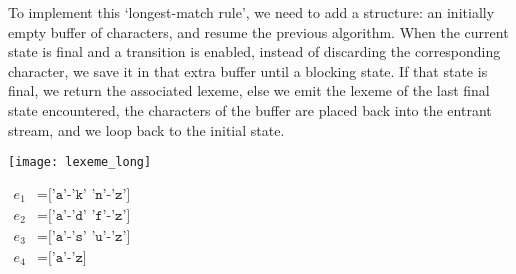 \documentclass[12pt,a4paper]{article}
\begin{document}
To implement this `longest\hyp{}match rule', we need to add a
structure: an initially empty buffer of characters, and resume the
previous algorithm. When the current state is final and a transition
is enabled, instead of discarding the corresponding character, we save
it in that extra buffer until a blocking state. If that state is
final, we return the associated lexeme, else we emit the lexeme of the
last final state encountered, the characters of the buffer are placed
back into the entrant stream, and we loop back to the initial state.
\begin{center}
\begin{minipage}{0.45\linewidth}
\texttt{[image: lexeme\_long]}
\end{minipage}
\hspace*{15mm}
\begin{minipage}{0.4\linewidth}
$\begin{aligned}
  e_1 &= \texttt{['a'-'k' 'n'-'z']}\\
  e_2 &= \texttt{['a'-'d' 'f'-'z']}\\
  e_3 &= \texttt{['a'-'s' 'u'-'z']}\\
  e_4 &= \texttt{['a'-'z]}
\end{aligned}$
\end{minipage}
\end{center}



\nocite*{}
\end{document}
